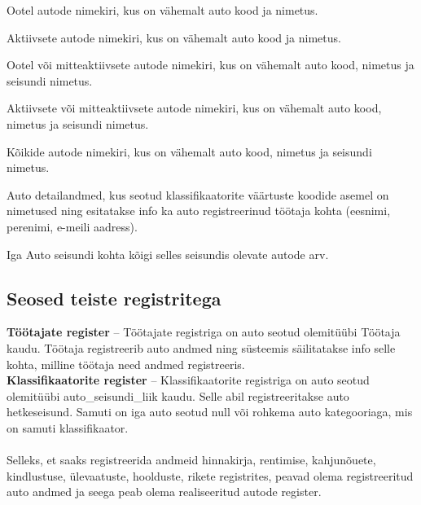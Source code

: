 \begin{myitemize}
	\item Ootel autode nimekiri, kus on vähemalt auto kood ja nimetus.
	\item Aktiivsete autode nimekiri, kus on vähemalt auto kood ja nimetus.
	\item Ootel või mitteaktiivsete autode nimekiri, kus on vähemalt auto kood, nimetus ja seisundi nimetus.
	\item Aktiivsete või mitteaktiivsete autode nimekiri, kus on vähemalt auto kood, nimetus ja seisundi nimetus.
	\item Kõikide autode nimekiri, kus on vähemalt auto kood, nimetus ja seisundi nimetus.
	\item Auto detailandmed, kus seotud klassifikaatorite väärtuste koodide asemel on nimetused ning esitatakse info ka auto registreerinud töötaja kohta (eesnimi, perenimi, e-meili aadress).
	\item Iga Auto seisundi kohta kõigi selles seisundis olevate autode arv.
\end{myitemize}

\subsection{Seosed teiste registritega}
\begin{flushleft}
\textbf{Töötajate register} – Töötajate registriga on auto seotud olemitüübi Töötaja kaudu. Töötaja registreerib auto andmed ning süsteemis säilitatakse info selle kohta, milline töötaja need andmed registreeris. \\
\textbf{Klassifikaatorite register} – Klassifikaatorite registriga on auto seotud olemitüübi auto_seisundi_liik kaudu. Selle abil registreeritakse auto hetkeseisund. Samuti on iga auto seotud null või rohkema auto kategooriaga, mis on samuti klassifikaator. \\~\\
Selleks, et saaks registreerida andmeid hinnakirja, rentimise, kahjunõuete, kindlustuse, ülevaatuste, hoolduste, rikete registrites, peavad olema registreeritud auto andmed ja seega peab olema realiseeritud autode register.
\end{flushleft}

